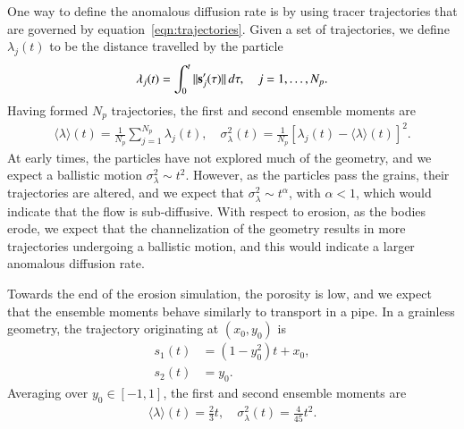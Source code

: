 \documentclass[preprint, 10pt]{elsarticle}
\begin{document}
One way to define the anomalous diffusion rate is by using tracer
trajectories that are governed by equation~\eqref{eqn:trajectories}.
Given a set of trajectories, we define $\lambda_j(t)$ to be the distance
travelled by the particle
\begin{align}
  \lambda_j(t) = \int_{0}^t \|\ss'_j(\tau)\|\, d\tau, 
    \quad j=1,\ldots,N_p.
\end{align}
Having formed $N_p$ trajectories, the first and second ensemble moments
are
\begin{align}
  \langle \lambda \rangle (t) = 
    \frac{1}{N_p} \sum_{j=1}^{N_p} \lambda_j(t), \quad 
    \sigma_\lambda^2(t) = \frac{1}{N_p} 
    \left[\lambda_j(t) - \langle \lambda \rangle(t) \right]^2.
\end{align}
At early times, the particles have not explored much of the geometry,
and we expect a ballistic motion $\sigma_\lambda^2 \sim t^2$.  However,
as the particles pass the grains, their trajectories are altered, and we
expect that $\sigma_\lambda^2 \sim t^\alpha$, with $\alpha < 1$, which
would indicate that the flow is sub-diffusive.  With respect to erosion,
as the bodies erode, we expect that the channelization of the geometry
results in more trajectories undergoing a ballistic motion, and this
would indicate a larger anomalous diffusion rate.

Towards the end of the erosion simulation, the porosity is low, and we
expect that the ensemble moments behave similarly to transport in a
pipe.  In a grainless geometry, the trajectory originating at
$(x_0,y_0)$ is
\begin{align}
  s_1(t) &= (1-y_0^2)t + x_0, \\
  s_2(t) &= y_0.
\end{align}
Averaging over $y_0 \in [-1,1]$, the first and second ensemble moments
are
\begin{align}
  \langle \lambda \rangle (t) = \frac{2}{3}t, \quad 
    \sigma_\lambda^2(t) = \frac{4}{45}t^2.
\end{align}


\end{document}
